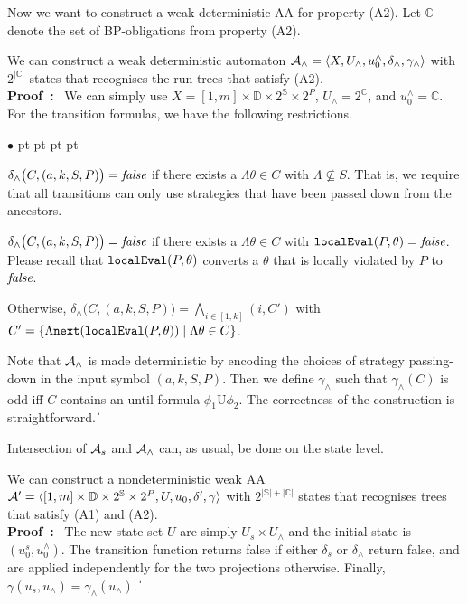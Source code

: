 \documentclass[11pt]{article}
\newcommand{\tteval}{\mbox{\tt localEval}}
\newcommand{\ttnxt}{\mbox{\tt next}}
\newcommand{\cala}{{\cal A}}
\newcommand{\false}{\mbox{\em false}}
\newcommand{\pf}{\noindent\mbox{\bf Proof : }}
\newcommand{\until}{\textrm{U}} %
\newcommand{\bbbbc}{{\mathbb C}}
\newcommand{\bbbbd}{{\mathbb D}}
\newcommand{\bbbbs}{{\mathbb S}}
\def\qed{\ifmmode\|\else{\unskip\nobreak\hfil
\penalty50\hskip1em\null\nobreak\hfil$\blacksquare$
\parfillskip=0pt\finalhyphendemerits=0\endgraf}\fi}
\newenvironment{list1}{\begin{list}{$\bullet$}
{\topsep 0 pt \parsep 0 pt \partopsep 0 pt \itemsep 0 pt}}{\end{list}}
\begin{document}
Now we want to construct a weak deterministic AA for property (A2).  
Let $\bbbbc$ denote the set of BP-obligations from property (A2).

{\lemma \label{lemma.A2} 
We can construct a weak deterministic automaton 
$\cala_\wedge=\langle X,U_\wedge,u_0^\wedge,\delta_\wedge, \gamma_\wedge 
\rangle$ with $2^{|\bbbbc|}$ states that recognises the run trees 
that satisfy (A2).
}
\\\pf 
We can simply use
$X = [1,m] \times \bbbbd \times 2^\bbbbs \times 2^P$,
$U_\wedge = 2^\bbbbc$, and 
$u_0^\wedge = \bbbbc$.  
For the transition formulas, 
we have the following restrictions. 
\begin{list1} 
\item $\delta_\wedge \big(C,(a,k,S,P)\big) =\false$ 
  if there exists a $\Lambda\theta\in C$ with $\Lambda\not\subseteq S$.  
  That is, we require that all transitions can only use strategies 
  that have been passed down from the ancestors.  
\item $\delta_\wedge \big(C,(a,k,S,P)\big) =\false$ 
  if there exists a $\Lambda\theta\in C$ with $\tteval(P,\theta)=\false$.  
  Please recall that $\tteval(P,\theta)$ 
  converts a $\theta$ that is locally violated by $P$ to $\false$.  
\item Otherwise, $\delta_\wedge \big(C,(a,k,S,P)\big)
  =\bigwedge_{i\in[1,k]} (i,C')$ with 
  $C' = \{\Lambda\ttnxt(\tteval(P,\theta))\mid \Lambda\theta \in C\}$.  
\end{list1} 
Note that $\cala_\wedge$ is made deterministic by encoding 
the choices of strategy passing-down in the input symbol $(a,k,S,P)$.  
Then we define $\gamma_\wedge$ such that $\gamma_\wedge(C)$ 
is odd iff $C$ contains an until formula $\phi_1 \until \phi_2$.
The correctness of the construction is straightforward.  
\qed 


Intersection of $\cala_s$ and $\cala_\wedge$ can, 
as usual, be done on the state level.

{\corollary \label{coro.aa.Ap}
We can construct a nondeterministic weak AA 
$\cala'=\langle [1,m] \times \bbbbd \times 2^\bbbbs \times 2^P,U,u_0,\delta', \gamma \rangle$ 
with $2^{|\bbbbs|+|\bbbbc|}$ states 
that recognises trees that satisfy (A1) and (A2).
}
\\\pf 
The new state set $U$ are simply $U_s \times U_\wedge$ and 
the initial state is $(u_0^s,u_0^\wedge)$.   
The transition function returns false 
if either $\delta_s$ or $\delta_\wedge$ return false, 
and are applied independently for the two projections otherwise.  
Finally, $\gamma(u_s,u_\wedge) = \gamma_\wedge(u_\wedge)$.
\qed 
\end{document}
